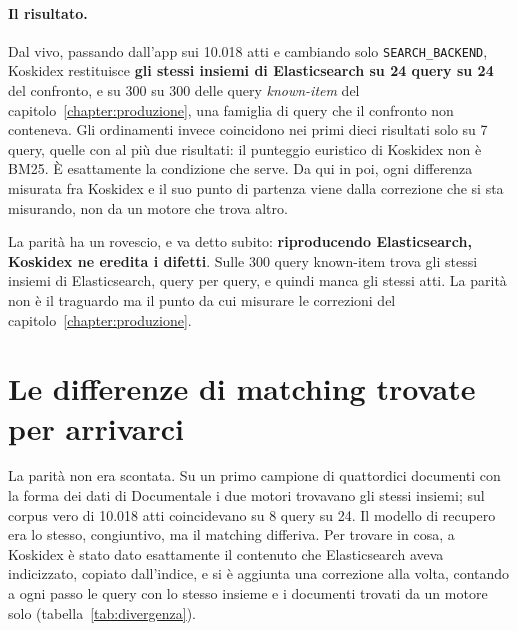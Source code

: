 \paragraph{Il risultato.} Dal vivo, passando dall'app sui 10.018 atti e cambiando
solo \texttt{SEARCH\_BACKEND}, Koskidex restituisce \textbf{gli stessi insiemi di
Elasticsearch su 24 query su 24} del confronto, e su 300 su 300 delle query
\emph{known-item} del capitolo~\ref{chapter:produzione}, una famiglia di query
che il confronto non conteneva. Gli ordinamenti invece coincidono nei primi dieci
risultati solo su 7 query, quelle con al più due risultati: il punteggio
euristico di Koskidex non è BM25. È esattamente la condizione che serve. Da qui
in poi, ogni differenza misurata fra Koskidex e il suo punto di partenza viene
dalla correzione che si sta misurando, non da un motore che trova altro.

La parità ha un rovescio, e va detto subito: \textbf{riproducendo Elasticsearch,
Koskidex ne eredita i difetti}. Sulle 300 query known-item trova gli stessi
insiemi di Elasticsearch, query per query, e quindi manca gli stessi atti. La parità non è il traguardo ma il punto da
cui misurare le correzioni del capitolo~\ref{chapter:produzione}.

\section{Le differenze di matching trovate per arrivarci}\label{sec:differenze}

La parità non era scontata. Su un primo campione di quattordici documenti con la
forma dei dati di Documentale i due motori trovavano gli stessi insiemi; sul
corpus vero di 10.018 atti coincidevano su 8 query su 24. Il modello di recupero
era lo stesso, congiuntivo, ma il matching differiva. Per trovare in cosa, a
Koskidex è stato dato esattamente il contenuto che Elasticsearch aveva
indicizzato, copiato dall'indice, e si è aggiunta una correzione alla volta,
contando a ogni passo le query con lo stesso insieme e i documenti trovati da un
motore solo (tabella~\ref{tab:divergenza}).

